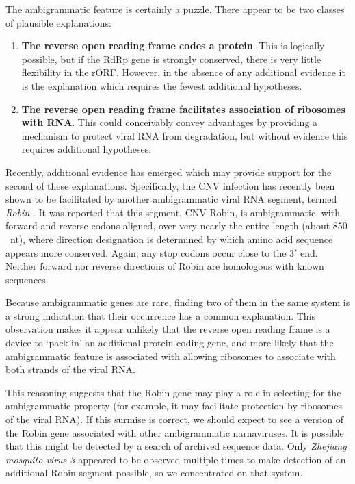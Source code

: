 \documentclass[unnumsec,webpdf,contemporary,large,namedate]{oup-authoring-template}%
\theoremstyle{thmstyleone}%
\theoremstyle{thmstyletwo}%
\theoremstyle{thmstylethree}%
\begin{document}
The ambigrammatic feature is certainly a puzzle. There appear to be two classes
of plausible explanations:

\begin{enumerate}

\item {\bf The reverse open reading frame codes a protein}. This is logically possible, but
if the RdRp gene is strongly conserved, there is very little flexibility in the rORF. However, in the
absence of any additional evidence it is the explanation which requires the fewest additional hypotheses.

\item {\bf The reverse open reading frame facilitates association of ribosomes with RNA}. This
could conceivably convey advantages by providing a mechanism to protect viral RNA from
degradation, but without  evidence this requires additional hypotheses.

\end{enumerate}

Recently, additional evidence has emerged which may provide support for the second of these explanations.
Specifically, the CNV infection has recently been shown to be facilitated by another ambigrammatic viral
RNA segment, termed \emph{Robin} \citep{Bat+20,Ret+20}. It was reported that this segment, CNV-Robin,
is ambigrammatic, with forward and reverse codons aligned, over very nearly
the entire length (about $850$~nt), where direction designation is determined by which amino acid sequence appears more conserved. Again, any stop codons occur close to the $3'$ end.
Neither forward nor reverse directions of Robin are homologous with known sequences.

Because ambigrammatic genes are rare, finding two of them in the same system is a strong
indication that their occurrence has a common explanation. This observation makes it
appear unlikely that the reverse open reading frame is a device to \lq pack in' an additional
protein coding gene, and more likely that the ambigrammatic feature is associated with
allowing ribosomes to associate with both strands of the viral RNA.

This reasoning suggests that the Robin gene may play a role in selecting for the
ambigrammatic property (for example, it may facilitate protection by ribosomes of the  viral RNA).
If this surmise is correct, we should expect to see a version of the Robin
gene associated with other ambigrammatic narnaviruses. It is possible that this might be detected
by a search of archived sequence data. Only \emph{Zhejiang mosquito virus 3} appeared to
be observed multiple times to make detection of an additional Robin segment possible, so we
concentrated on that system.
\end{document}
